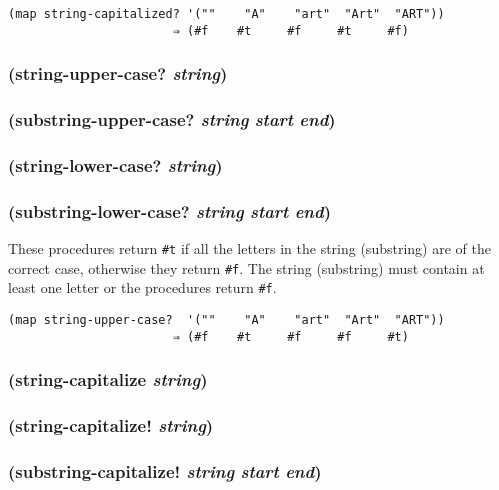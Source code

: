 \documentclass{article}
\begin{document}
\begin{verbatim}
(map string-capitalized? '(""    "A"    "art"  "Art"  "ART"))
                       ⇒ (#f    #t     #f     #t     #f)
\end{verbatim}

\subsubsection{(string-upper-case? \emph{string})}

\subsubsection{(substring-upper-case? \emph{string} \emph{start} \emph{end})}

\subsubsection{(string-lower-case? \emph{string})}

\subsubsection{(substring-lower-case? \emph{string} \emph{start} \emph{end})}

These procedures return \verb|#t| if all the letters in the string (substring) are of the
correct case, otherwise they return \verb|#f|. The string (substring) must contain at least
one letter or the procedures return \verb|#f|.

\begin{verbatim}
(map string-upper-case?  '(""    "A"    "art"  "Art"  "ART"))
                       ⇒ (#f    #t     #f     #f     #t)
\end{verbatim}

\subsubsection{(string-capitalize \emph{string})}

\subsubsection{(string-capitalize! \emph{string})}

\subsubsection{(substring-capitalize! \emph{string} \emph{start} \emph{end})}
\end{document}

